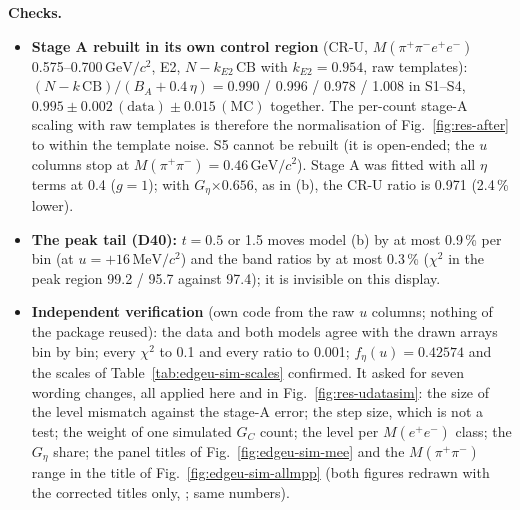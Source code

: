 \documentclass[11pt,a4paper]{article}
\newcommand{\Mfour}{\ensuremath{M(\pi^{+}\pi^{-}e^{+}e^{-})}\xspace}
\newcommand{\Mee}{\ensuremath{M(e^{+}e^{-})}\xspace}
\newcommand{\Mpipi}{\ensuremath{M(\pi^{+}\pi^{-})}\xspace}
\newcommand{\GeVcc}{\ensuremath{\mathrm{GeV}/c^{2}}\xspace}
\newcommand{\MeVcc}{\ensuremath{\mathrm{MeV}/c^{2}}\xspace}
\newcommand{\code}[1]{\texttt{\detokenize{#1}}}
\newcommand{\kEtwo}{\ensuremath{k_{E2}}\xspace}
\newcommand{\Geta}{\ensuremath{G_\eta}\xspace}
\begin{document}
\textbf{Checks.}
\begin{itemize}\setlength{\itemsep}{1pt}
\item \textbf{Stage A rebuilt in its own control region} (CR-U, \Mfour 0.575--0.700\,\GeVcc, E2, $N-\kEtwo\,\mathrm{CB}$ with $\kEtwo=0.954$, raw
      templates): $(N-k\,\mathrm{CB})/(B_A+0.4\,\eta)=0.990$ / 0.996 / 0.978 / 1.008 in S1--S4, $0.995\pm0.002\,(\mathrm{data})\pm0.015\,
      (\mathrm{MC})$ together. The per-count stage-A scaling with raw templates is therefore the normalisation of Fig.~\ref{fig:res-after} to
      within the template noise. S5 cannot be rebuilt (it is open-ended; the $u$ columns stop at \Mpipi$=0.46$\,\GeVcc). Stage A was fitted with
      all $\eta$ terms at 0.4 ($g=1$); with \Geta$\times0.656$, as in (b), the CR-U ratio is 0.971 (2.4\,\% lower).
\item \textbf{The peak tail (D40):} $t=0.5$ or 1.5 moves model (b) by at most 0.9\,\% per bin (at $u=+16$\,\MeVcc) and the band ratios by at most
      0.3\,\% ($\chi^2$ in the peak region 99.2 / 95.7 against 97.4); it is invisible on this display.
\item \textbf{Independent verification} (own code from the raw $u$ columns; nothing of the package reused): the data and both models agree with
      the drawn arrays bin by bin; every $\chi^2$ to 0.1 and every ratio to 0.001; $f_\eta(u)=0.42574$ and the scales of
      Table~\ref{tab:edgeu-sim-scales} confirmed. It asked for seven wording changes, all applied here and in Fig.~\ref{fig:res-udatasim}: the
      size of the level mismatch against the stage-A error; the step size, which is not a test; the weight of one simulated $G_C$ count; the level
      per \Mee class; the \Geta share; the panel titles of Fig.~\ref{fig:edgeu-sim-mee} and the \Mpipi range in the title of
      Fig.~\ref{fig:edgeu-sim-allmpp} (both figures redrawn with the corrected titles only, \code{udatasim_figs_v2.py}; same numbers).
\end{itemize}
\end{document}
